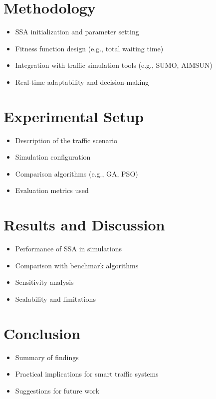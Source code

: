 \documentclass[12pt]{article}
\begin{document}
\section{Methodology}
\begin{itemize}[leftmargin=2em]
    \item SSA initialization and parameter setting
    \item Fitness function design (e.g., total waiting time)
    \item Integration with traffic simulation tools (e.g., SUMO, AIMSUN)
    \item Real-time adaptability and decision-making
\end{itemize}

\section{Experimental Setup}
\begin{itemize}[leftmargin=2em]
    \item Description of the traffic scenario
    \item Simulation configuration
    \item Comparison algorithms (e.g., GA, PSO)
    \item Evaluation metrics used
\end{itemize}

\section{Results and Discussion}
\begin{itemize}[leftmargin=2em]
    \item Performance of SSA in simulations
    \item Comparison with benchmark algorithms
    \item Sensitivity analysis
    \item Scalability and limitations
\end{itemize}

\section{Conclusion}
\begin{itemize}[leftmargin=2em]
    \item Summary of findings
    \item Practical implications for smart traffic systems
    \item Suggestions for future work
\end{itemize}
\end{document}
